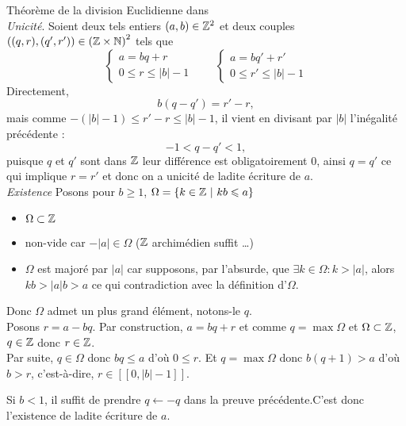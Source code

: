 \documentclass{article}
\renewenvironment{question_kholle}[2][ ]
{
	\subsection{\texorpdfstring{#2}{}}
	\notblank{#1}
	{
		\noindent #1
		\bigbreak
	}
	{}
	\begin{proof}
}
{
	\end{proof}
}
\begin{document}
	{Théorème de la division Euclidienne dans \Z}
	\hfill\\
	\textit{Unicité}. \;
	Soient deux tels entiers $(a,b) \in \mathbb Z^2$ et deux couples $((q,r),(q',r')) \in \left(\mathbb Z \times \mathbb N\right)^2$ tels que
	\begin{equation*}
		\left\{ \begin{matrix}
			a = b q + r \\
			0 \leqslant r \leqslant |b| - 1
		\end{matrix} \right.
		\qquad
		\left\{ \begin{matrix}
			a = b q' + r' \\
			0 \leqslant r' \leqslant |b| - 1
		\end{matrix} \right.
	\end{equation*}
	Directement,
	\[
		b(q-q') = r'-r,
	\]
	mais comme $-(|b|-1) \leqslant r' - r \leqslant |b| -1$, il vient en divisant par $|b|$ l'inégalité précédente :
	\[
		-1 < q - q' < 1,
	\]
	puisque $q$ et $q'$ sont dans $\mathbb Z$ leur différence est obligatoirement $0$, ainsi $q = q'$ ce qui implique $ r= r'$ et donc on a unicité de ladite écriture de $a$.
	\newline
	\\
	\textit{Existence} \; Posons pour $b \geqslant 1$, $\Omega = \{ k\in \mathbb Z  \ | \ kb \leqslant a \}$
	\begin{itemize}
		\item $\Omega \subset \mathbb Z$
		\item non-vide car $-|a| \in \Omega$ ($\mathbb Z$ archimédien suffit \ldots)
		\item $\Omega$ est majoré par $|a|$ car supposons, par l'absurde, que $\exists k \in \Omega : k > |a|$, alors $kb > |a|b > a$ ce qui contradiction avec la définition d'$\Omega$.
	\end{itemize}
	Donc $\Omega$ admet un plus grand élément, notons-le $q$. \\
	Posons $r = a - bq$. Par construction, $a = bq + r$ et comme $q = \max \Omega$ et $\Omega \subset \mathbb Z$, $q \in \mathbb Z$ donc $r \in \mathbb Z$.
	\\
	Par suite, $q \in \Omega$ donc $bq \leqslant a$ d'où $0 \leqslant r$. Et $q = \max \Omega$ donc $b(q+1) > a$ d'où $b > r$, c'est-à-dire, $r\in [\![ 0, |b| -1 ]\!]$.

	Si $b< 1$, il suffit de prendre $q \leftarrow -q$ dans la preuve précédente.C'est donc l'existence de ladite écriture de $a$.
\end{question_kholle}
\end{document}
